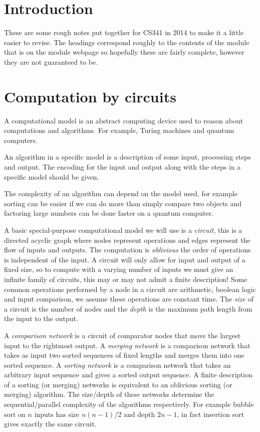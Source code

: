 \documentclass[11pt,a4paper]{article}
\theoremstyle{definition}
\begin{document}
\maketitle

\section{Introduction}
These are some rough notes put together for CS341 in 2014 to make it a little easier to revise.
The headings correspond roughly to the contents of the module that is on the module webpage so hopefully these are fairly complete, however they are not guaranteed to be.

\section{Computation by circuits}
A computational model is an abstract computing device used to reason about computations and algorithms.
For example, Turing machines and quantum computers.

An algorithm in a specific model is a description of some input, processing steps and output.
The encoding for the input and output along with the steps in a specific model should be given.

The complexity of an algorithm can depend on the model used, for example sorting can be easier if we can do more than simply compare two objects and factoring large numbers can be done faster on a quantum computer.

A basic special-purpose computational model we will use is a \emph{circuit}, this is a directed acyclic graph where nodes represent operations and edges represent the flow of inputs and outputs.
The computation is \emph{oblivious} the order of operations is independent of the input.
A circuit will only allow for input and output of a fixed size, so to compute with a varying number of inputs we must give an infinite family of circuits, this may or may not admit a finite description!
Some common operations performed by a node in a circuit are arithmetic, boolean logic and input comparison, we assume these operations are constant time.
The \emph{size} of a circuit is the number of nodes and the \emph{depth} is the maximum path length from the input to the output.

A \emph{comparison network} is a circuit of comparator nodes that move the largest input to the rightmost output.
A \emph{merging network} is a comparison network that takes as input two sorted sequences of fixed lengths and merges them into one sorted sequence.
A \emph{sorting network} is a comparison network that takes an arbitrary input sequence and gives a sorted output sequence.
A finite description of a sorting (or merging) networks is equivalent to an oblivious sorting (or merging) algorithm.
The size/depth of these networks determine the sequential/parallel complexity of the algorithms respectively.
For example bubble sort on $n$ inputs has size $n(n-1)/2$ and depth $2n-1$, in fact insertion sort gives exactly the same circuit.
\end{document}
